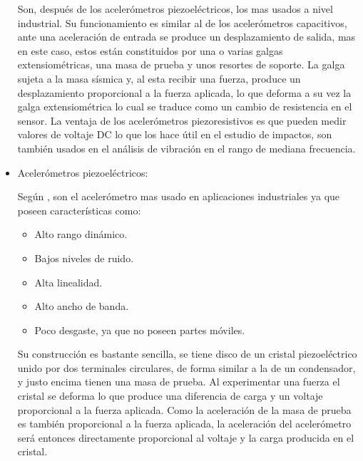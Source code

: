 \begin{itemize}
        Son, después de los acelerómetros piezoeléctricos, los mas usados a nivel
        industrial. Su funcionamiento es similar al de los acelerómetros
        capacitivos, ante una aceleración de entrada se produce un desplazamiento
        de salida, mas en este caso, estos están constituidos por una o varias
        galgas extensiométricas, una masa de prueba y unos resortes de soporte.
        La galga sujeta a la masa sísmica y, al esta recibir una fuerza, produce
        un desplazamiento proporcional a la fuerza aplicada, lo que deforma a
        su vez la galga extensiométrica lo cual se traduce como un
        cambio de resistencia en el sensor. La ventaja de los acelerómetros
        piezoresistivos es que pueden medir valores de voltaje DC lo que los
        hace útil en el estudio de impactos, son también usados en el
        análisis de vibración en el rango de mediana frecuencia.


    \item Acelerómetros piezoeléctricos:

        Según \cite{WeberPiezoelectricAT}, son el acelerómetro mas usado en
        aplicaciones industriales ya que
        poseen características como:

        \begin{itemize}[noitemsep]
            \item Alto rango dinámico.
            \item Bajos niveles de ruido.
            \item Alta linealidad.
            \item Alto ancho de banda.
            \item Poco desgaste, ya que no poseen partes móviles.
        \end{itemize}


        Su construcción es bastante sencilla, se tiene disco de un cristal
        piezoeléctrico unido por dos terminales circulares, de forma similar a
        la de un condensador, y justo encima tienen una masa de prueba.
        Al experimentar una fuerza el cristal se deforma lo que produce una
        diferencia de carga y un voltaje proporcional a la fuerza aplicada.
        Como la aceleración de la masa de prueba es también proporcional a la
        fuerza aplicada, la aceleración del acelerómetro será entonces
        directamente proporcional al voltaje y la carga producida en el cristal.

\end{itemize}


